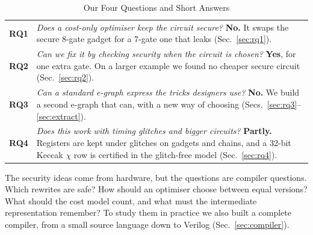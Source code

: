 \documentclass[conference]{IEEEtran}
\begin{document}
\begin{table}[t]
\caption{Our Four Questions and Short Answers}\label{tab:rq}
\centering\footnotesize
\begin{tabularx}{\columnwidth}{@{}>{\bfseries\color{blue}}l>{\raggedright\arraybackslash}X@{}}
\toprule
RQ1 & \emph{Does a cost-only optimiser keep the circuit secure?} \textbf{No.} It swaps the secure 8-gate gadget for a 7-gate one that leaks (Sec.~\ref{sec:rq1}).\\[2pt]
RQ2 & \emph{Can we fix it by checking security when the circuit is chosen?} \textbf{Yes}, for one extra gate. On a larger example we found no cheaper secure circuit (Sec.~\ref{sec:rq2}).\\[2pt]
RQ3 & \emph{Can a standard e-graph express the tricks designers use?} \textbf{No.} We build a second e-graph that can, with a new way of choosing (Secs.~\ref{sec:rq3}--\ref{sec:extract}).\\[2pt]
RQ4 & \emph{Does this work with timing glitches and bigger circuits?} \textbf{Partly.} Registers are kept under glitches on gadgets and chains, and a 32-bit Keccak $\chi$ row is certified in the glitch-free model (Sec.~\ref{sec:rq4}).\\
\bottomrule
\end{tabularx}
\end{table}

The security ideas come from hardware, but the questions are compiler questions. Which rewrites are safe? How should an optimiser choose between equal versions? What should the cost model count, and what must the intermediate representation remember? To study them in practice we also built a complete compiler, from a small source language down to Verilog (Sec.~\ref{sec:compiler}).
\end{document}
